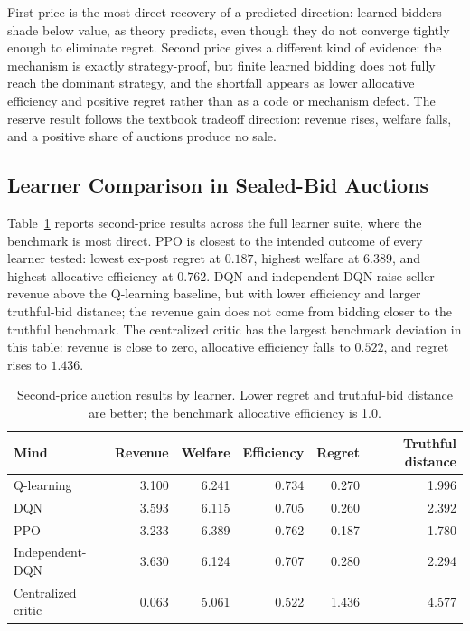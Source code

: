 \documentclass[11pt]{article}
\begin{document}
First price is the most direct recovery of a predicted direction: learned bidders
shade below value, as theory predicts, even though they do not converge tightly
enough to eliminate regret. Second price gives a different kind of evidence:
the mechanism is exactly strategy-proof, but finite learned bidding does not
fully reach the dominant strategy, and the shortfall appears as lower
allocative efficiency and positive regret rather than as a code or mechanism
defect. The reserve result follows the textbook tradeoff direction: revenue
rises, welfare falls, and a positive share of auctions produce no sale.

\subsection{Learner Comparison in Sealed-Bid Auctions}

Table~\ref{tab:auction-crossmind-second} reports second-price results across
the full learner suite, where the benchmark is most direct. PPO is closest to the
intended outcome of every learner tested: lowest ex-post regret at \(0.187\),
highest welfare at \(6.389\), and highest allocative efficiency at \(0.762\).
DQN and independent-DQN raise seller revenue above the Q-learning baseline, but
with lower efficiency and larger truthful-bid distance; the revenue gain does
not come from bidding closer to the truthful benchmark. The centralized critic
has the largest benchmark deviation in this table: revenue is close to zero,
allocative efficiency falls to \(0.522\), and regret rises to \(1.436\).

\begin{table}[h]
\centering
\begin{tabular}{lrrrrr}
\toprule
Mind & Revenue & Welfare & Efficiency & Regret & Truthful distance \\
\midrule
Q-learning & 3.100 & 6.241 & 0.734 & 0.270 & 1.996 \\
DQN & 3.593 & 6.115 & 0.705 & 0.260 & 2.392 \\
PPO & 3.233 & 6.389 & 0.762 & 0.187 & 1.780 \\
Independent-DQN & 3.630 & 6.124 & 0.707 & 0.280 & 2.294 \\
Centralized critic & 0.063 & 5.061 & 0.522 & 1.436 & 4.577 \\
\bottomrule
\end{tabular}
\caption{Second-price auction results by learner. Lower regret and truthful-bid distance are better; the benchmark allocative efficiency is 1.0.}
\label{tab:auction-crossmind-second}
\end{table}
\end{document}
